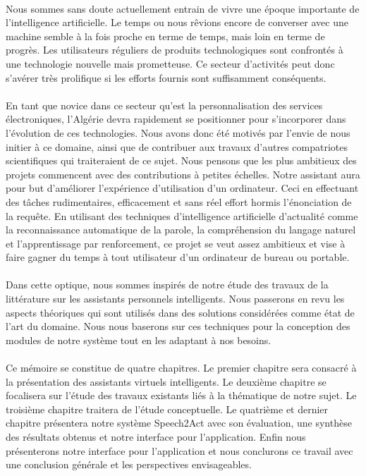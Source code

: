 \paragraph{}
Nous sommes sans doute actuellement entrain de vivre une époque importante de l'intelligence artificielle. Le temps ou nous rêvions encore de converser avec une machine semble à la fois proche en terme de temps, mais loin en terme de progrès. Les utilisateurs réguliers de produits technologiques sont confrontés à une technologie nouvelle mais prometteuse. Ce secteur d'activités peut donc s'avérer très prolifique si les efforts fournis sont suffisamment conséquents.

\paragraph{}
En tant que novice dans ce secteur qu'est la personnalisation des services électroniques, l'Algérie devra rapidement se positionner pour s'incorporer dans l'évolution de ces technologies. Nous avons donc été motivés par l'envie de nous initier à ce domaine, ainsi que de contribuer aux travaux d'autres compatriotes scientifiques qui traiteraient de ce sujet. Nous pensons que les plus ambitieux des projets commencent avec des contributions à petites échelles. Notre assistant aura pour but d'améliorer l'expérience d'utilisation d'un ordinateur. Ceci en effectuant des tâches rudimentaires, efficacement et sans réel effort hormis l'énonciation de la requête. En utilisant des techniques d'intelligence artificielle d'actualité comme la reconnaissance automatique de la parole, la compréhension du langage naturel et l'apprentissage par renforcement, ce projet se veut assez ambitieux et vise à faire gagner du temps à tout utilisateur d'un ordinateur de bureau ou portable.
	
\paragraph{}
Dans cette optique, nous sommes inspirés de notre étude des travaux de la littérature sur les assistants personnels intelligents. Nous passerons en revu les aspects théoriques qui sont utilisés dans des solutions considérées comme état de l'art du domaine. Nous nous baserons sur ces techniques pour la conception des modules de notre système tout en les adaptant à nos besoins. 

\paragraph{}
Ce mémoire se constitue de quatre chapitres. Le premier chapitre sera consacré à la présentation des assistants virtuels intelligents. Le deuxième chapitre se focalisera sur l'étude des travaux existants liés à la thématique  de notre sujet. Le troisième chapitre traitera de l'étude conceptuelle. Le quatrième et dernier chapitre présentera notre système Speech2Act avec son évaluation, une synthèse des résultats obtenus et notre interface pour l'application. Enfin nous présenterons notre interface pour l'application et nous conclurons ce travail avec une conclusion générale et les perspectives envisageables.
